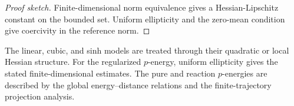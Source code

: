 \begin{proof}[Proof sketch]
Finite-dimensional norm equivalence gives a Hessian-Lipschitz constant on the bounded set. Uniform ellipticity and the zero-mean condition give coercivity in the reference norm.
\end{proof}

The linear, cubic, and sinh models are treated through their quadratic or local Hessian structure. For the regularized \(p\)-energy, uniform ellipticity gives the stated finite-dimensional estimates. The pure and reaction \(p\)-energies are described by the global energy--distance relations and the finite-trajectory projection analysis.
